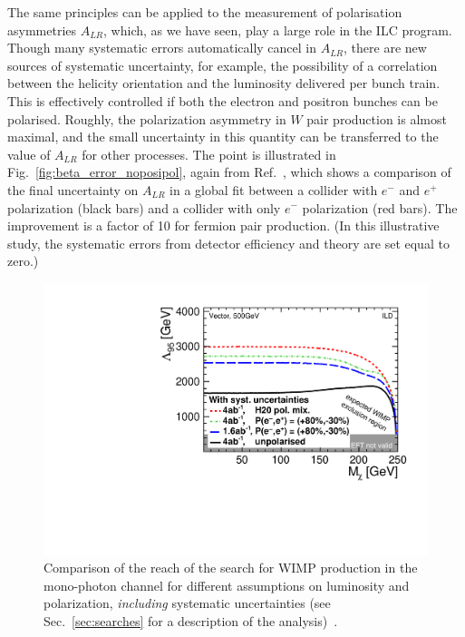 The same principles can be applied to the measurement of polarisation asymmetries $A_{LR}$, which, as we have seen, play a large role in the ILC program.   Though many systematic 
errors automatically cancel in $A_{LR}$, there are new sources of systematic uncertainty, for example, the possibility of a correlation between the helicity orientation and the luminosity delivered per bunch train.   This is effectively controlled if both the electron and positron 
bunches can be polarised.  Roughly, the polarization asymmetry in $W$ pair production is almost maximal, and the small uncertainty in this quantity can be transferred to the value of $A_{LR}$ for other processes. The point is illustrated in Fig.~\ref{fig:beta_error_noposipol}, again from Ref.~\cite{bib:PhDRobert}, which shows a comparison of the final uncertainty on 
$A_{LR}$ in a global fit between a collider with $e^-$ and $e^+$ polarization (black bars) and a collider with only $e^-$ polarization (red bars). The improvement is a factor of 10 for 
fermion pair production.  (In this illustrative study, the systematic errors from detector efficiency and theory are set equal to zero.) 

\begin{figure}
\centering
\includegraphics[width=0.95\linewidth]{./chapters/figures/vector_withSystematics.pdf}
		
\caption{Comparison of the reach of the search for WIMP production in the mono-photon channel for different assumptions on luminosity and polarization, {\em including} systematic uncertainties (see Sec.~\ref{sec:searches} for a description of the analysis)~\cite{Habermehl:417605}. }
\label{fig:polWIMPsys}
\end{figure}


